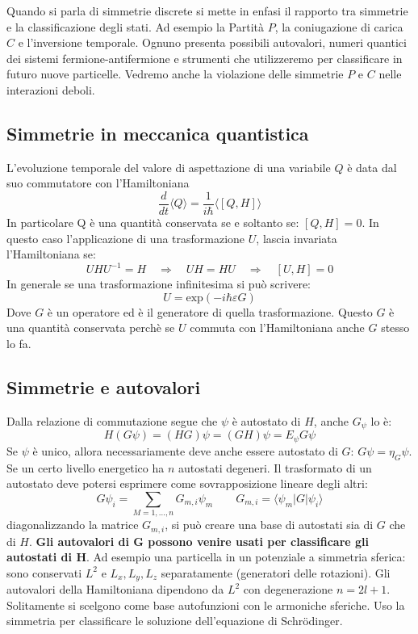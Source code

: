 Quando si parla di simmetrie discrete si mette in enfasi il rapporto tra simmetrie e la classificazione degli stati. Ad esempio la Partità $P$, la coniugazione di carica $C$ e l'inversione temporale. Ognuno presenta possibili autovalori, numeri quantici dei sistemi fermione-antifermione e strumenti che utilizzeremo per classificare in futuro nuove particelle. Vedremo anche la violazione delle simmetrie $P$ e $C$ nelle interazioni deboli. 
\subsection{Simmetrie in meccanica quantistica}
L'evoluzione temporale del valore di aspettazione di una variabile $Q$ è data dal suo commutatore con l'Hamiltoniana
\begin{equation*}
    \frac{d}{dt}\langle Q\rangle=\frac{1}{i\hbar}\langle [Q,H]\rangle
\end{equation*}
In particolare Q è una quantità conservata se e soltanto se: $[Q,H]=0$. In questo caso l'applicazione di una trasformazione $U$, lascia invariata l'Hamiltoniana se:
\begin{equation*}
    UHU^{-1}=H \quad \Rightarrow \quad UH=HU \quad \Rightarrow \quad [U,H]=0
\end{equation*}
In generale se una trasformazione infinitesima si può scrivere:
\begin{equation*}
    U=\text{exp}(-i\hbar\varepsilon G)
\end{equation*}
Dove $G$ è un operatore ed è il generatore di quella trasformazione. Questo $G$ è una quantità conservata perchè se $U$ commuta con l'Hamiltoniana anche $G$ stesso lo fa.
\subsection{Simmetrie e autovalori}
Dalla relazione di commutazione segue che $\psi$ è autostato di $H$, anche $G_\psi$ lo è:
\begin{equation*}
    H(G\psi)=(HG)\psi=(GH)\psi=E_\psi G\psi
\end{equation*}
Se $\psi$ è unico, allora necessariamente deve anche essere autostato di $G$: $G\psi=\eta_G\psi$. Se un certo livello energetico ha $n$ autostati degeneri. Il trasformato di un autostato deve potersi esprimere come sovrapposizione lineare degli altri:
\begin{equation*}
    G\psi_i=\sum_{M=1,\ldots,n}G_{m,i}\psi_m\qquad G_{m,i}=\langle\psi_m|G|\psi_i\rangle
\end{equation*}
diagonalizzando la matrice $G_{m,i}$, si può creare una base di autostati sia di $G$ che di $H$. \textbf{Gli autovalori di G possono venire usati per classificare gli autostati di H}. Ad esempio una particella in un potenziale a simmetria sferica: sono conservati $L^2$ e $L_x,L_y,L_z$ separatamente (generatori delle rotazioni). Gli autovalori della Hamiltoniana dipendono da $L^2$ con degenerazione $n=2l+1$. Solitamente si scelgono come base autofunzioni con le armoniche sferiche. Uso la simmetria per classificare le soluzione dell'equazione di Schr\"odinger.
